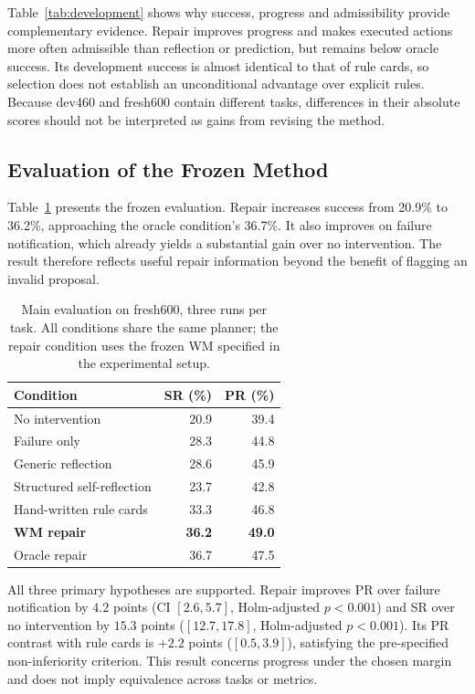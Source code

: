 \documentclass[runningheads]{llncs}
\begin{document}
Table~\ref{tab:development} shows why success, progress and admissibility provide complementary evidence. Repair improves progress and makes executed actions more often admissible than reflection or prediction, but remains below oracle success. Its development success is almost identical to that of rule cards, so selection does not establish an unconditional advantage over explicit rules. Because dev460 and fresh600 contain different tasks, differences in their absolute scores should not be interpreted as gains from revising the method.

\subsection{Evaluation of the Frozen Method}
Table~\ref{tab:main} presents the frozen evaluation. Repair increases success from 20.9\% to 36.2\%, approaching the oracle condition's 36.7\%. It also improves on failure notification, which already yields a substantial gain over no intervention. The result therefore reflects useful repair information beyond the benefit of flagging an invalid proposal.

\begin{table}[tbp]
\caption{Main evaluation on fresh600, three runs per task. All conditions share the same planner; the repair condition uses the frozen WM specified in the experimental setup.}
\label{tab:main}\centering
\begin{tabular}{lrr}\toprule
Condition & SR (\%) & PR (\%)\\\midrule
No intervention & 20.9 & 39.4\\
Failure only & 28.3 & 44.8\\
Generic reflection & 28.6 & 45.9\\
Structured self-reflection & 23.7 & 42.8\\
Hand-written rule cards & 33.3 & 46.8\\
\textbf{WM repair} & \textbf{36.2} & \textbf{49.0}\\
Oracle repair & 36.7 & 47.5\\\bottomrule
\end{tabular}
\end{table}

All three primary hypotheses are supported. Repair improves PR over failure notification by $4.2$ points (CI $[2.6,5.7]$, Holm-adjusted $p<0.001$) and SR over no intervention by $15.3$ points ($[12.7,17.8]$, Holm-adjusted $p<0.001$). Its PR contrast with rule cards is $+2.2$ points ($[0.5,3.9]$), satisfying the pre-specified non-inferiority criterion. This result concerns progress under the chosen margin and does not imply equivalence across tasks or metrics.
\end{document}
